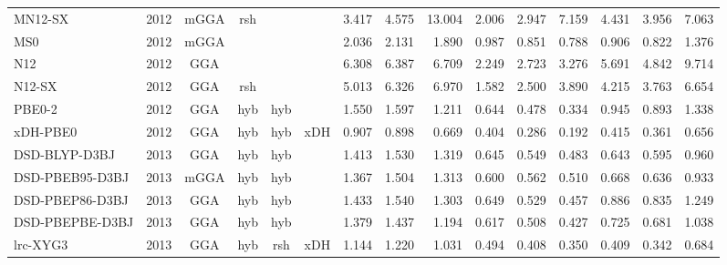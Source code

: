 \begin{landscape}
\begin{longtable}{lcccccrrrrrrrrr}
    MN12-SX          & 2012 & mGGA & rsh      &             &           & 3.417             & 4.575             & 13.004 & 2.006              & 2.947             & 7.159  & 4.431   & 3.956 & 7.063 \\
    MS0              & 2012 & mGGA &          &             &           & 2.036             & 2.131             & 1.890  & 0.987              & 0.851             & 0.788  & 0.906   & 0.822 & 1.376 \\
    N12              & 2012 & GGA  &          &             &           & 6.308             & 6.387             & 6.709  & 2.249              & 2.723             & 3.276  & 5.691   & 4.842 & 9.714 \\
    N12-SX           & 2012 & GGA  & rsh      &             &           & 5.013             & 6.326             & 6.970  & 1.582              & 2.500             & 3.890  & 4.215   & 3.763 & 6.654 \\
    PBE0-2           & 2012 & GGA  & hyb      & hyb         &           & 1.550             & 1.597             & 1.211  & 0.644              & 0.478             & 0.334  & 0.945   & 0.893 & 1.338 \\
    xDH-PBE0         & 2012 & GGA  & hyb      & hyb         & xDH       & 0.907             & 0.898             & 0.669  & 0.404              & 0.286             & 0.192  & 0.415   & 0.361 & 0.656 \\
    DSD-BLYP-D3BJ    & 2013 & GGA  & hyb      & hyb         &           & 1.413             & 1.530             & 1.319  & 0.645              & 0.549             & 0.483  & 0.643   & 0.595 & 0.960 \\
    DSD-PBEB95-D3BJ  & 2013 & mGGA & hyb      & hyb         &           & 1.367             & 1.504             & 1.313  & 0.600              & 0.562             & 0.510  & 0.668   & 0.636 & 0.933 \\
    DSD-PBEP86-D3BJ  & 2013 & GGA  & hyb      & hyb         &           & 1.433             & 1.540             & 1.303  & 0.649              & 0.529             & 0.457  & 0.886   & 0.835 & 1.249 \\
    DSD-PBEPBE-D3BJ  & 2013 & GGA  & hyb      & hyb         &           & 1.379             & 1.437             & 1.194  & 0.617              & 0.508             & 0.427  & 0.725   & 0.681 & 1.038 \\
    lrc-XYG3         & 2013 & GGA  & hyb      & rsh         & xDH       & 1.144             & 1.220             & 1.031  & 0.494              & 0.408             & 0.350  & 0.409   & 0.342 & 0.684 \\

\end{longtable}
\end{landscape}
